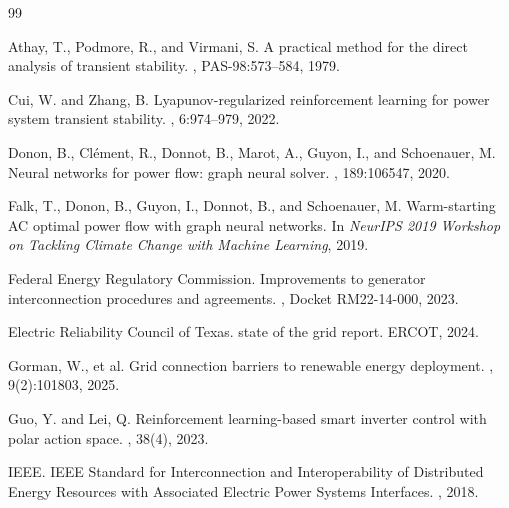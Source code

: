 \documentclass{article}
\begin{document}

\begin{thebibliography}{99}
\small

Athay, T., Podmore, R., and Virmani, S.
\newblock A practical method for the direct analysis of transient stability.
, PAS-98:573--584, 1979.

Cui, W. and Zhang, B.
\newblock Lyapunov-regularized reinforcement learning for power system
  transient stability.
, 6:974--979, 2022.

Donon, B., Cl\'ement, R., Donnot, B., Marot, A., Guyon, I., and
  Schoenauer, M.
\newblock Neural networks for power flow: graph neural solver.
, 189:106547, 2020.

Falk, T., Donon, B., Guyon, I., Donnot, B., and Schoenauer, M.
\newblock Warm-starting AC optimal power flow with graph neural networks.
\newblock In {\em NeurIPS 2019 Workshop on Tackling Climate Change with
  Machine Learning}, 2019.

Federal Energy Regulatory Commission.
\newblock Improvements to generator interconnection procedures and
  agreements.
, Docket RM22-14-000, 2023.

Electric Reliability Council of Texas.
 state of the grid report.
\newblock ERCOT, 2024.

Gorman, W., et al.
\newblock Grid connection barriers to renewable energy deployment.
, 9(2):101803, 2025.

Guo, Y. and Lei, Q.
\newblock Reinforcement learning-based smart inverter control with polar
  action space.
, 38(4), 2023.

IEEE.
\newblock IEEE Standard for Interconnection and Interoperability of
  Distributed Energy Resources with Associated Electric Power Systems
  Interfaces.
, 2018.


\end{thebibliography}
\end{document}
